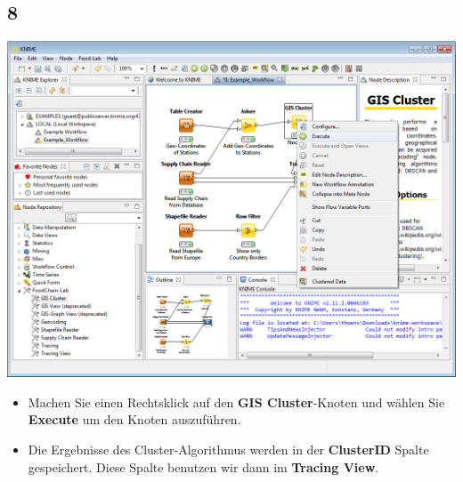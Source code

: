 \documentclass{beamer}
\begin{document}
\subsection{8}
\begin{frame}
	\begin{center}
  		\includegraphics[height=0.6\textheight]{8.png}
	\end{center}
	\begin{itemize}
		\item Machen Sie einen Rechtsklick auf den \textbf{GIS Cluster}-Knoten und wählen Sie \textbf{Execute} um den Knoten auszuführen.
		\item Die Ergebnisse des Cluster-Algorithmus werden in der \textbf{ClusterID} Spalte gespeichert. Diese Spalte benutzen wir dann im \textbf{Tracing View}.
	\end{itemize}
\end{frame}
\end{document}
